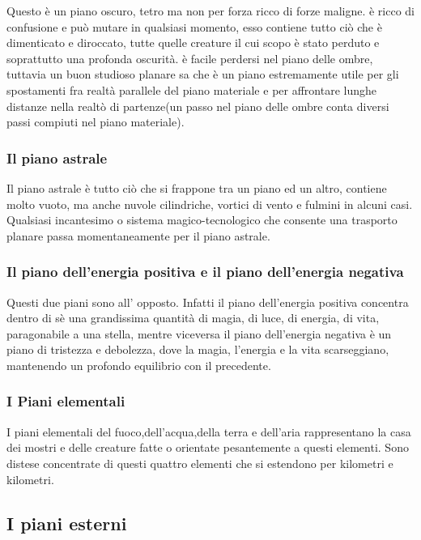 \documentclass[a4paper,12pt]{book}
\begin{document}
Questo è un piano oscuro, tetro ma non per forza ricco di forze maligne. è ricco di confusione e può mutare in qualsiasi momento, esso contiene tutto ciò che è dimenticato e diroccato, tutte quelle creature il cui scopo è stato perduto e soprattutto una profonda oscurità. è facile perdersi nel piano delle ombre, tuttavia un buon studioso planare sa che è un piano estremamente utile per gli spostamenti fra realtà parallele del piano materiale e per affrontare lunghe distanze nella realtò di partenze(un passo nel piano delle ombre conta diversi passi compiuti nel piano materiale).

\subsubsection{Il piano astrale}

Il piano astrale è tutto ciò che si frappone tra un piano ed un altro, contiene molto vuoto, ma anche nuvole cilindriche, vortici di vento e fulmini in alcuni casi.
Qualsiasi incantesimo o sistema magico-tecnologico che consente una trasporto planare passa momentaneamente per il piano astrale.

\subsubsection{Il piano dell'energia positiva e il piano dell'energia negativa}

Questi due piani sono all' opposto. Infatti il piano dell'energia positiva concentra dentro di sè una grandissima quantità di magia, di luce, di energia, di vita, paragonabile a una stella, mentre viceversa il piano dell'energia negativa è un piano di tristezza e debolezza, dove la magia, l'energia e la vita scarseggiano, mantenendo un profondo equilibrio con il precedente.

\subsubsection{I Piani elementali}

I piani elementali del fuoco,dell'acqua,della terra e dell'aria rappresentano la casa dei mostri e delle creature fatte o orientate pesantemente a questi elementi.
Sono distese concentrate di questi quattro elementi che si estendono per kilometri e kilometri.

\subsection{I piani esterni}
\end{document}
